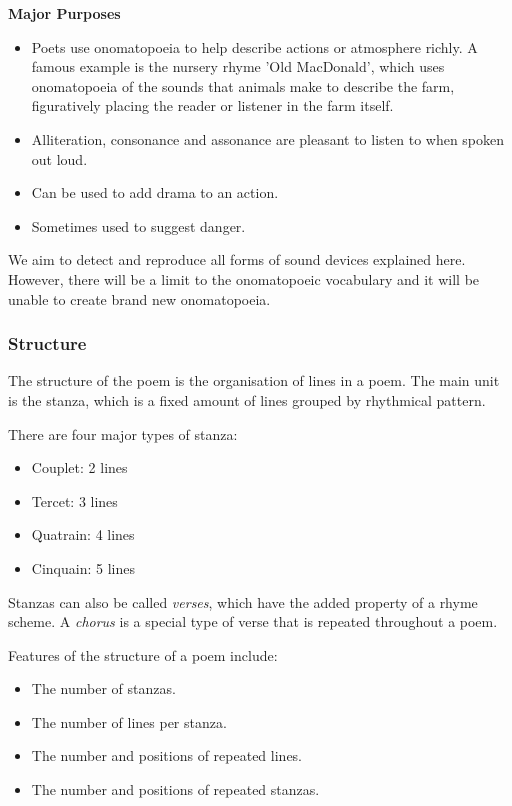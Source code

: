 \textbf{Major Purposes}
\begin{itemize}
\item{Poets use onomatopoeia to help describe actions or atmosphere richly. A famous example is the nursery rhyme 'Old MacDonald', which uses onomatopoeia of the sounds that animals make to describe the farm, figuratively placing the reader or listener in the farm itself.} 
\item{Alliteration, consonance and assonance are pleasant to listen to when spoken out loud.}
\item{Can be used to add drama to an action.}
\item{Sometimes used to suggest danger.}
\end{itemize}

We aim to detect and reproduce all forms of sound devices explained here. However, there will be a limit to the onomatopoeic vocabulary and it will be unable to create brand new onomatopoeia.

\subsubsection{Structure}
The structure of the poem is the organisation of lines in a poem. The main unit is the stanza, which is a fixed amount of lines grouped by rhythmical pattern.

There are four major types of stanza:
\begin{itemize}
\item{Couplet: 2 lines}
\item{Tercet: 3 lines}
\item{Quatrain: 4 lines}
\item{Cinquain: 5 lines}
\end{itemize}

Stanzas can also be called \textit{verses}, which have the added property of a rhyme scheme. A \textit{chorus} is a special type of verse that is repeated throughout a poem.

Features of the structure of a poem include:
\begin{itemize}
\item{The number of stanzas.}
\item{The number of lines per stanza.}
\item{The number and positions of repeated lines.}
\item{The number and positions of repeated stanzas.}
\end{itemize} 

